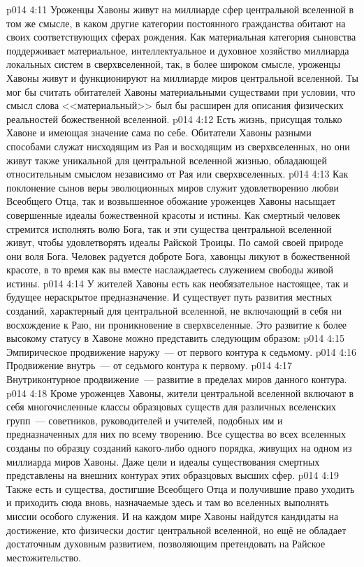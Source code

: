 \vs p014 4:11 Уроженцы Хавоны живут на миллиарде сфер центральной вселенной в том же смысле, в каком другие категории постоянного гражданства обитают на своих соответствующих сферах рождения. Как материальная категория сыновства поддерживает материальное, интеллектуальное и духовное хозяйство миллиарда локальных систем в сверхвселенной, так, в более широком смысле, уроженцы Хавоны живут и функционируют на миллиарде миров центральной вселенной. Ты мог бы считать обитателей Хавоны материальными существами при условии, что смысл слова <<материальный>> был бы расширен для описания физических реальностей божественной вселенной.
\vs p014 4:12 Есть жизнь, присущая только Хавоне и имеющая значение сама по себе. Обитатели Хавоны разными способами служат нисходящим из Рая и восходящим из сверхвселенных, но они живут также уникальной для центральной вселенной жизнью, обладающей относительным смыслом независимо от Рая или сверхвселенных.
\vs p014 4:13 Как поклонение сынов веры эволюционных миров служит удовлетворению любви Всеобщего Отца, так и возвышенное обожание уроженцев Хавоны насыщает совершенные идеалы божественной красоты и истины. Как смертный человек стремится исполнять волю Бога, так и эти существа центральной вселенной живут, чтобы удовлетворять идеалы Райской Троицы. По самой своей природе они  воля Бога. Человек радуется доброте Бога, хавонцы ликуют в божественной красоте, в то время как вы вместе наслаждаетесь служением свободы живой истины.
\vs p014 4:14 У жителей Хавоны есть как необязательное настоящее, так и будущее нераскрытое предназначение. И существует путь развития местных созданий, характерный для центральной вселенной, не включающий в себя ни восхождение к Раю, ни проникновение в сверхвселенные. Это развитие к более высокому статусу в Хавоне можно представить следующим образом:
\vs p014 4:15 Эмпирическое продвижение наружу~--- от первого контура к седьмому.
\vs p014 4:16 Продвижение внутрь~--- от седьмого контура к первому.
\vs p014 4:17 Внутриконтурное продвижение~--- развитие в пределах миров данного контура.
\vs p014 4:18 \pc Кроме уроженцев Хавоны, жители центральной вселенной включают в себя многочисленные классы образцовых существ для различных вселенских групп~--- советников, руководителей и учителей, подобных им и предназначенных для них по всему творению. Все существа во всех вселенных созданы по образцу созданий какого\hyp{}либо одного порядка, живущих на одном из миллиарда миров Хавоны. Даже цели и идеалы существования смертных представлены на внешних контурах этих образцовых высших сфер.
\vs p014 4:19 Также есть и существа, достигшие Всеобщего Отца и получившие право уходить и приходить сюда вновь, назначаемые здесь и там во вселенных выполнять миссии особого служения. И на каждом мире Хавоны найдутся кандидаты на достижение, кто физически достиг центральной вселенной, но ещё не обладает достаточным духовным развитием, позволяющим претендовать на Райское местожительство.
